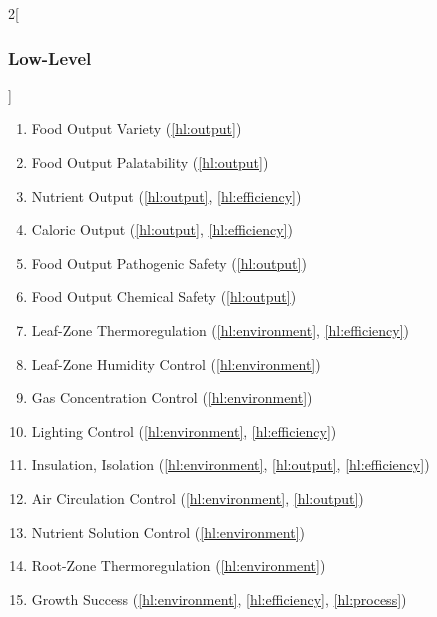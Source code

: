 \documentclass{../tex/report}
\begin{document}
\begin{multicols}{2}[\subsubsection{Low-Level}\label{sec:llos}]
    \begin{enumerate}[label=LL\arabic*., ref=LL\arabic*]
        \item \label{ll:output_variety} Food Output Variety                 \hfill (\ref{hl:output})
        \item \label{ll:output_palatability} Food Output Palatability       \hfill (\ref{hl:output})
        \item \label{ll:output_nutrients} Nutrient Output                   \hfill (\ref{hl:output}, \ref{hl:efficiency})
        \item \label{ll:output_energy} Caloric Output                       \hfill (\ref{hl:output}, \ref{hl:efficiency})
        \item \label{ll:output_pathogen} Food Output Pathogenic Safety      \hfill (\ref{hl:output})
        \item \label{ll:output_chemical} Food Output Chemical Safety        \hfill (\ref{hl:output})
        \item \label{ll:control_airtemp} Leaf-Zone Thermoregulation         \hfill (\ref{hl:environment}, \ref{hl:efficiency})
        \item \label{ll:control_airhum} Leaf-Zone Humidity Control          \hfill (\ref{hl:environment})
        \item \label{ll:control_gas} Gas Concentration Control              \hfill (\ref{hl:environment})
        \item \label{ll:control_light} Lighting Control                     \hfill (\ref{hl:environment}, \ref{hl:efficiency})
        \item \label{ll:insulateisolate} Insulation, Isolation              \hfill (\ref{hl:environment}, \ref{hl:output}, \ref{hl:efficiency})
        \item \label{ll:control_aircirculation} Air Circulation Control     \hfill (\ref{hl:environment}, \ref{hl:output})
        \item \label{ll:control_nutrientsolution} Nutrient Solution Control \hfill (\ref{hl:environment})
        \item \label{ll:control_roottemp} Root-Zone Thermoregulation        \hfill (\ref{hl:environment})
        \item \label{ll:success} Growth Success                             \hfill (\ref{hl:environment}, \ref{hl:efficiency}, \ref{hl:process})

\end{enumerate}
\end{multicols}
\end{document}
